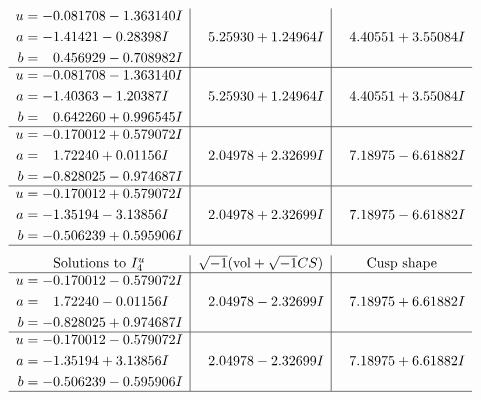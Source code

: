 \documentclass[1p]{elsarticle_modified}
\theoremstyle{definition}
\newcommand{\I}{\sqrt{-1}}
\begin{document}
$$\begin{array}{c|c|c}
\begin{aligned}
u &= -0.081708 - 1.363140 I \\
a &= -1.41421 - 0.28398 I \\
b &= \phantom{-}0.456929 - 0.708982 I\end{aligned}
 & \phantom{-}5.25930 + 1.24964 I & \phantom{-}4.40551 + 3.55084 I \\ \hline\begin{aligned}
u &= -0.081708 - 1.363140 I \\
a &= -1.40363 - 1.20387 I \\
b &= \phantom{-}0.642260 + 0.996545 I\end{aligned}
 & \phantom{-}5.25930 + 1.24964 I & \phantom{-}4.40551 + 3.55084 I \\ \hline\begin{aligned}
u &= -0.170012 + 0.579072 I \\
a &= \phantom{-}1.72240 + 0.01156 I \\
b &= -0.828025 - 0.974687 I\end{aligned}
 & \phantom{-}2.04978 + 2.32699 I & \phantom{-}7.18975 - 6.61882 I \\ \hline\begin{aligned}
u &= -0.170012 + 0.579072 I \\
a &= -1.35194 - 3.13856 I \\
b &= -0.506239 + 0.595906 I\end{aligned}
 & \phantom{-}2.04978 + 2.32699 I & \phantom{-}7.18975 - 6.61882 I\\
 \hline 
 \end{array}$$\newpage$$\begin{array}{c|c|c}  
\text{Solutions to }I^u_{4}& \I (\text{vol} + \sqrt{-1}CS) & \text{Cusp shape}\\
 \hline 
\begin{aligned}
u &= -0.170012 - 0.579072 I \\
a &= \phantom{-}1.72240 - 0.01156 I \\
b &= -0.828025 + 0.974687 I\end{aligned}
 & \phantom{-}2.04978 - 2.32699 I & \phantom{-}7.18975 + 6.61882 I \\ \hline\begin{aligned}
u &= -0.170012 - 0.579072 I \\
a &= -1.35194 + 3.13856 I \\
b &= -0.506239 - 0.595906 I\end{aligned}
 & \phantom{-}2.04978 - 2.32699 I & \phantom{-}7.18975 + 6.61882 I\\
 \hline 
 \end{array}$$\newpage
\end{document}
